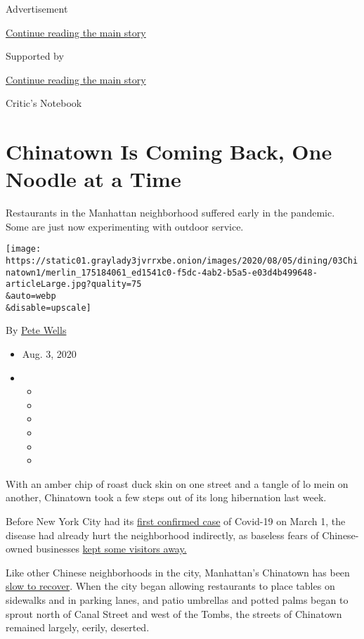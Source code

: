 Advertisement

\protect\hyperlink{after-top}{Continue reading the main story}

Supported by

\protect\hyperlink{after-sponsor}{Continue reading the main story}

Critic's Notebook

\hypertarget{chinatown-is-coming-back-one-noodle-at-a-time}{%
\section{Chinatown Is Coming Back, One Noodle at a
Time}\label{chinatown-is-coming-back-one-noodle-at-a-time}}

Restaurants in the Manhattan neighborhood suffered early in the
pandemic. Some are just now experimenting with outdoor service.

\texttt{[image: https://static01.graylady3jvrrxbe.onion/images/2020/08/05/dining/03Chinatown1/merlin\_175184061\_ed1541c0-f5dc-4ab2-b5a5-e03d4b499648-articleLarge.jpg?quality=75\\\&auto=webp\\\&disable=upscale]}

By \href{https://www.nytimes3xbfgragh.onion/by/pete-wells}{Pete Wells}

\begin{itemize}
\item
  Aug. 3, 2020
\item
  \begin{itemize}
  \item
  \item
  \item
  \item
  \item
  \item
  \end{itemize}
\end{itemize}

With an amber chip of roast duck skin on one street and a tangle of lo
mein on another, Chinatown took a few steps out of its long hibernation
last week.

Before New York City had its
\href{https://www.nytimes3xbfgragh.onion/2020/03/01/nyregion/new-york-coronvirus-confirmed.html}{first
confirmed case} of Covid-19 on March 1, the disease had already hurt the
neighborhood indirectly, as baseless fears of Chinese-owned businesses
\href{https://www.nytimes3xbfgragh.onion/2020/01/29/nyregion/coronavirus-nyc.html}{kept
some visitors away.}

Like other Chinese neighborhoods in the city, Manhattan's Chinatown has
been
\href{https://www.nytimes3xbfgragh.onion/2020/06/30/nyregion/chinatown-coronavirus-nyc.html?searchResultPosition=1}{slow
to recover}. When the city began allowing restaurants to place tables on
sidewalks and in parking lanes, and patio umbrellas and potted palms
began to sprout north of Canal Street and west of the Tombs, the streets
of Chinatown remained largely, eerily, deserted.

